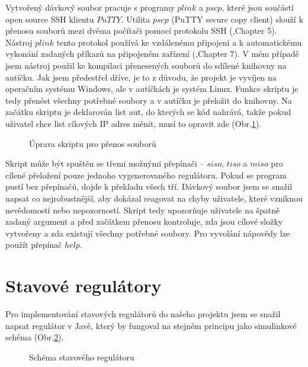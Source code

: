 \documentclass[thesis=M,czech,hidelinks]{FITthesis}[2012/06/26]
\begin{document}
Vytvořený dávkový soubor pracuje s programy $plink$ a $pscp$, které jsou součástí open source SSH klientu $PuTTY$\cite{putty}. Utilita $pscp$ (PuTTY secure copy client) slouží k přenosu souborů mezi dvěma počítači pomocí protokolu SSH (\cite{putty},Chapter 5). Nástroj $plink$ tento protokol používá ke vzdálenému připojení a k automatickému vykonání zadaných příkazů na připojeném zařízení (\cite{putty},Chapter 7). V mém případě jsem nástroj použil ke kompilaci přenesených souborů do sdílené knihovny na autíčku. Jak jsem předestřel dříve, je to z důvodu, že projekt je vyvíjen na operačním systému Windows, ale v autíčkách je systém Linux. Funkce skriptu je tedy přenést všechny potřebné soubory a v autíčku je přeložit do knihovny. Na začátku skriptu je deklarován list aut, do kterých se kód nahrává, takže pokud uživatel chce list cílových IP adres měnit, musí to opravit zde (Obr.\ref{fig:tutvar}). 
\begin{figure}[h]
        \centering
        \caption{Úprava skriptu pro přenos souborů}
        \label{fig:tutvar}
\end{figure}

Skript může být spuštěn se třemi možnými přepínači – $siso$, $tiso$ a $miso$ pro cílené přeložení pouze jednoho vygenerovaného regulátoru. Pokud se program pustí bez přepínačů, dojde k překladu všech tří. Dávkový soubor jsem se snažil napsat co nejrobustnější, aby dokázal reagovat na chyby uživatele, které vzniknou nevědomostí nebo nepozorností. Skript tedy upozorňuje uživatele na špatně zadaný argument a před začátkem přenosu kontroluje, zda jsou cílové složky vytvořeny a zda existují všechny potřebné soubory. Pro vyvolání nápovědy lze použít přepínač $help$.

\section{Stavové regulátory}
Pro implementování stavových regulátorů do našeho projektu jsem se snažil napsat regulátor v Javě, který by fungoval na stejném principu jako simulinkové schéma (Obr.\ref{fig:statesim}). 
\begin{figure}[h]
        \centering
        \caption{Schéma stavového regulátoru\cite{state}}
        \label{fig:statesim}
\end{figure}
\end{document}
